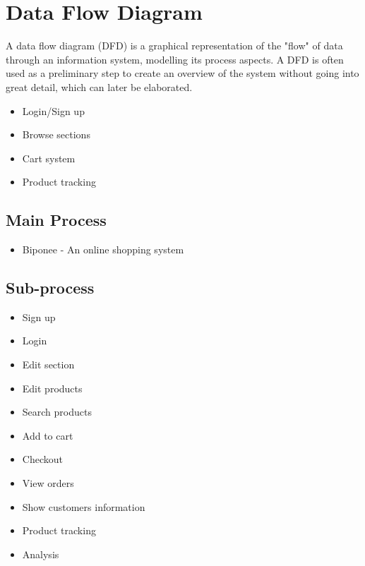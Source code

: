 

\section{Data Flow Diagram}

A data flow diagram (DFD) is a graphical representation of the "flow" of data through an information system, modelling its process aspects. A DFD is often used as a preliminary step to create an overview of the system without going into great detail, which can later be elaborated.
\begin{itemize}
  \item Login/Sign up
  \item Browse sections
    \item Cart system
  \item Product tracking
  
\end{itemize}


 \subsection{Main Process}
 
 \begin{itemize}
  \item Biponee - An online shopping system
  \end{itemize}

 \subsection{Sub-process}
  \begin{itemize}
    \item Sign up
    \item Login
    \item Edit section
    \item Edit products
    \item Search products
    \item Add to cart
    \item Checkout
     \item View orders
    \item Show customers information
    \item Product tracking
    \item Analysis
    
    

\end{itemize}


